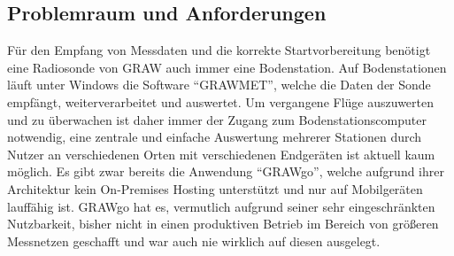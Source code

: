 \subsection{Problemraum und Anforderungen}
Für den Empfang von Messdaten und die korrekte Startvorbereitung benötigt eine Radiosonde von GRAW auch immer eine Bodenstation.
Auf Bodenstationen läuft unter Windows die Software \enquote{GRAWMET}\cite{grawmet}, welche die Daten der Sonde empfängt, weiterverarbeitet und auswertet.
Um vergangene Flüge auszuwerten und zu überwachen ist daher immer der Zugang zum Bodenstationscomputer notwendig, eine zentrale und einfache Auswertung mehrerer Stationen durch Nutzer an verschiedenen Orten mit verschiedenen Endgeräten ist aktuell kaum möglich.
Es gibt zwar bereits die Anwendung \enquote{GRAWgo}\cite{grawgo}, welche aufgrund ihrer Architektur kein On-Premises Hosting unterstützt und nur auf Mobilgeräten lauffähig ist.
GRAWgo hat es, vermutlich aufgrund seiner sehr eingeschränkten Nutzbarkeit, bisher nicht in einen produktiven Betrieb im Bereich von größeren Messnetzen geschafft und war auch nie wirklich auf diesen ausgelegt.

